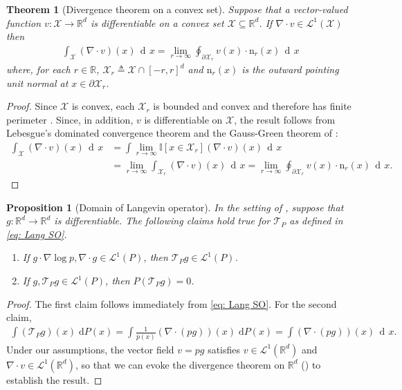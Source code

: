 \documentclass[12pt,paper=letter]{scrreprt}
\newtheorem{theorem}{Theorem}[chapter]
\newtheorem{proposition}{Proposition}[chapter]
\newcommand{\dee}{\mathop{\mathrm{d}\!}}
\newcommand{\dx}{\,\dee x}
\def\mbb#1{\mathbb{#1}}
\def\reals{\mathbb{R}} %
\def\R{\mathbb{R}}
\newcommand{\Rd}{{\R}^d}
\def\defeq{\triangleq} %
\def\indic#1{\mbb{I}\left[{#1}\right]} %
\newcommand{\grad}{\nabla} %
\newcommand{\Div}[1]{\grad\cdot{#1}} %
\newcommand{\normal}{\mathrm{n}} %
\newcommand{\xset}[0]{\mathcal{X}} %
\newcommand{\TP}{\mathcal{T}_P}
\newcommand{\Lp}[1][p]{\mathcal{L}^{#1}}
\begin{document}
\begin{theorem}[Divergence theorem on a convex set]\label{thm:convex_divergence}
Suppose that a vector-valued function $v : \xset \rightarrow \reals^d$ is differentiable on a convex set $\xset\subseteq\Rd$. 
If $\Div{v}\in\Lp[1](\xset)$ then
\begin{align*}
\int_{\xset} (\Div{v})(x) \dx 
    = 
\lim_{r\to\infty}\oint_{\partial \xset_r} v(x) \cdot \normal_r(x) \dx
\end{align*}
where, for each $r\in\reals$,  $\xset_r\defeq \xset \cap[-r,r]^d$ and $\normal_r(x)$ is the outward pointing unit normal at $x \in \partial \xset_r$.
\end{theorem}
\begin{proof}
Since $\xset$ is convex, each  $\xset_r$ is bounded and convex and therefore has finite perimeter \citep[Lem.~2.4]{buttazzo1995minimum}. 
Since, in addition, $v$ is differentiable on $\xset$, the result follows from Lebesgue's dominated convergence theorem \citep[Thm.~1.34]{rudin1987real} and the Gauss-Green theorem of \citet[Thm.~5.19 and Prop.~5.8]{pfeffer2012divergence}:
\begin{align*}
\int_{\xset} (\Div{v})(x) \dx 
    &= 
\int \lim_{r\to\infty}\indic{x\in\xset_r} (\Div{v})(x) \dx \\
    &=
\lim_{r\to\infty} \int_{\xset_r} (\Div{v})(x) \dx 
    = 
\lim_{r\to\infty}\oint_{\partial \xset_r} v(x) \cdot \normal_r(x) \dx.
\end{align*}

\end{proof}












\begin{proposition}[Domain of Langevin operator] \label{lem: Stein op int by parts}
In the setting of , suppose that $g : \reals^d \rightarrow \reals^d$ is differentiable.
The following claims hold true for $\TP$ as defined in \cref{eq: Lang SO}.
\begin{enumerate}
\item If $g\cdot \grad \log p, \grad \cdot g \in \mathcal{L}^1(P)$, then $\TP g \in \mathcal{L}^1(P)$.
\item If $g, \TP g \in \mathcal{L}^1(P)$, then $P(\TP g) = 0$. 
\end{enumerate}
\end{proposition}
\begin{proof}
The first claim follows immediately from \cref{eq: Lang SO}.
For the second claim, 
\begin{align*}
\int (\TP g)(x) \; \mathrm{d}P(x) 
 = \int \frac{1}{p(x)} (\nabla \cdot (p g))(x) \; \mathrm{d}P(x)
 = \int (\nabla \cdot (p g))(x) \dx .
\end{align*}
Under our assumptions, the vector field $v = pg$ satisfies $v \in \mathcal{L}^1(\mathbb{R}^d)$ and $\nabla \cdot v \in \mathcal{L}^1(\mathbb{R}^d)$, so that we can evoke the divergence theorem on $\mathbb{R}^d$ () to establish the result.
\end{proof}
\end{document}
